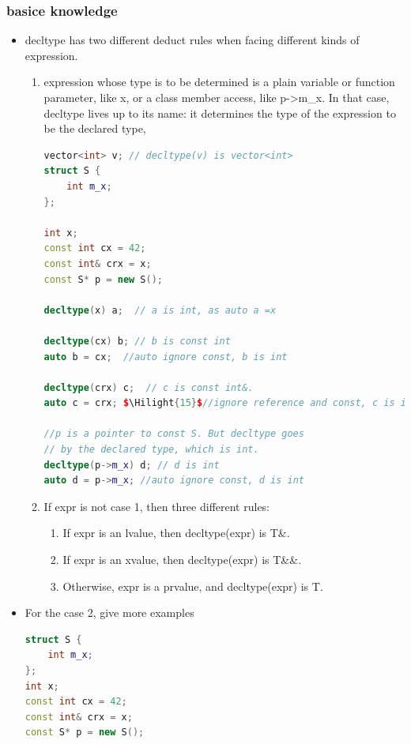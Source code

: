 \documentclass[a4paper,11pt,twoside]{book}
\newcommand{\Hilight}[1]{\makebox[0pt][l]{\color{yellow}\rule[-3pt]{#1em}{11pt}}}
\newcommand{\Hilight}[1]{}
\begin{document}
\subsubsection{basice knowledge}
\begin{itemize}
	\item decltype has two different deduct rules when facing different kinds of expression.
	
	\begin{enumerate}
		\item expression whose type is to be determined is a plain variable or function parameter, like x, or a class member access, like p->m\_x. In that case, decltype lives up to its name: it determines the type of the expression to be the declared type,
\begin{lstlisting}[frame=single, language=c++]
vector<int> v; // decltype(v) is vector<int>
struct S {
	int m_x;
};

int x;
const int cx = 42;
const int& crx = x;
const S* p = new S();

decltype(x) a;  // a is int, as auto a =x

decltype(cx) b; // b is const int
auto b = cx;  //auto ignore const, b is int

decltype(crx) c;  // c is const int&.
auto c = crx; $\Hilight{15}$//ignore reference and const, c is int

//p is a pointer to const S. But decltype goes
// by the declared type, which is int.
decltype(p->m_x) d; // d is int
auto d = p->m_x; //auto ignore const, d is int
\end{lstlisting}
		
		\item If expr is not case 1, then three different rules:
		\begin{enumerate}
			\item If expr is an lvalue, then decltype(expr) is T\&. 
			\item If expr is an xvalue, then decltype(expr) is T\&\&. 
			\item Otherwise, expr is a prvalue, and decltype(expr) is T.
		\end{enumerate}
	\end{enumerate}

	\item For the case 2, give more examples
\begin{lstlisting}[frame=single, language=c++]
struct S {
	int m_x;
};
int x;
const int cx = 42;
const int& crx = x;
const S* p = new S();


\end{lstlisting}
\end{itemize}
\end{document}
